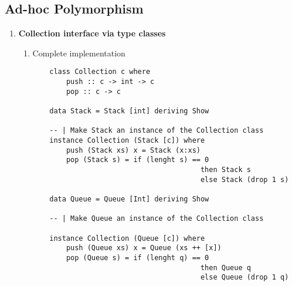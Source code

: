 \documentclass{article}
\begin{document}
\subsection{Ad-hoc Polymorphism}
\begin{enumerate}
	\item \textbf{Collection interface via type classes}
		\begin{enumerate}
			\item Complete implementation
				\begin{lstlisting}
	class Collection c where
		push :: c -> int -> c
		pop :: c -> c
	
	data Stack = Stack [int] deriving Show

	-- | Make Stack an instance of the Collection class
	instance Collection (Stack [c]) where
		push (Stack xs) x = Stack (x:xs)
		pop (Stack s) = if (lenght s) == 0 
										then Stack s
										else Stack (drop 1 s)
	
	data Queue = Queue [Int] deriving Show
	
	-- | Make Queue an instance of the Collection class

	instance Collection (Queue [c]) where
		push (Queue xs) x = Queue (xs ++ [x])
		pop (Queue s) = if (lenght q) == 0 
										then Queue q
										else Queue (drop 1 q)
				\end{lstlisting}
		\end{enumerate}
\end{enumerate}

\end{document}
